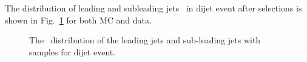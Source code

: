 The distribution of leading and subleading jets \pt~in dijet event after selections is shown in Fig.~\ref{fig:QG-2samplePt} for both MC and data.




\begin{figure}[htb]
        \centering
         \quad
         \quad
        \caption[]{
	  The \pt~distribution of the leading jets and sub-leading jets with \pythia samples for dijet event.
                \label{fig:QG-2samplePt}
        }
\end{figure}




